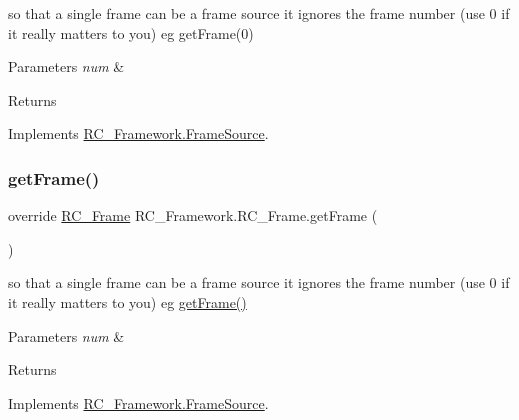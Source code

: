 so that a single frame can be a frame source it ignores the frame number (use 0 if it really matters to you) eg get\+Frame(0) 


\begin{DoxyParams}{Parameters}
{\em num} & \\
\hline
\end{DoxyParams}
\begin{DoxyReturn}{Returns}

\end{DoxyReturn}


Implements \mbox{\hyperlink{class_r_c___framework_1_1_frame_source_a562dc295b5c265ec760227978802eb3a}{R\+C\+\_\+\+Framework.\+Frame\+Source}}.

\mbox{\label{class_r_c___framework_1_1_r_c___frame_a9262ade99ade9dc102aac56587d55d0f}} 
\subsubsection{\texorpdfstring{get\+Frame()}{getFrame()}\hspace{0.1cm}{\footnotesize\ttfamily [2/2]}}
{\footnotesize\ttfamily override \mbox{\hyperlink{class_r_c___framework_1_1_r_c___frame}{R\+C\+\_\+\+Frame}} R\+C\+\_\+\+Framework.\+R\+C\+\_\+\+Frame.\+get\+Frame (\begin{DoxyParamCaption}{ }\end{DoxyParamCaption})\hspace{0.3cm}{\ttfamily [virtual]}}



so that a single frame can be a frame source it ignores the frame number (use 0 if it really matters to you) eg \mbox{\hyperlink{class_r_c___framework_1_1_r_c___frame_a9262ade99ade9dc102aac56587d55d0f}{get\+Frame()}} 


\begin{DoxyParams}{Parameters}
{\em num} & \\
\hline
\end{DoxyParams}
\begin{DoxyReturn}{Returns}

\end{DoxyReturn}


Implements \mbox{\hyperlink{class_r_c___framework_1_1_frame_source_a6fd84a8d608da7d9ff2ff5ab10ed4243}{R\+C\+\_\+\+Framework.\+Frame\+Source}}.



